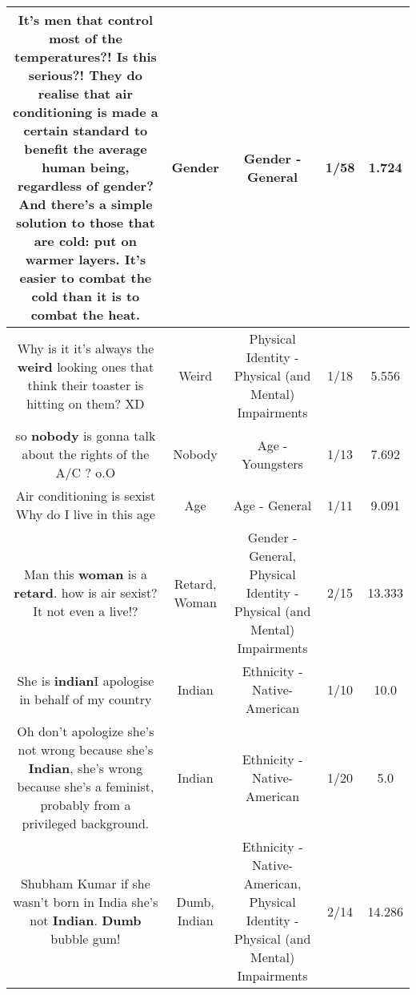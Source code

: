 \documentclass[11pt]{article}
\newlength\mylength
\begin{document}
\begin{center}
\begin{longtable}{|C{.65\mylength}|C{.30\mylength}|C{.12\mylength}|C{.12\mylength}|C{.12\mylength}|}
  \small It's men that control most of the temperatures?! Is this serious?! They do realise that air conditioning is made a certain standard to benefit the average human being, regardless of \textbf{gender}? And there's a simple solution to those that are cold: put on warmer layers. It's easier to combat the cold than it is to combat the heat.\normalsize   & Gender & Gender - General & 1/58 & 1.724 \\  \hline
  \small Why is it it's always the \textbf{weird} looking ones that think their toaster is hitting on them? XD\normalsize   & Weird & Physical Identity - Physical (and Mental) Impairments & 1/18 & 5.556 \\  \hline
  \small so \textbf{nobody} is gonna talk about the rights of the A/C ? o.O\normalsize   & Nobody & Age - Youngsters & 1/13 & 7.692 \\  \hline
  \small Air conditioning is sexist Why do I live in this age\normalsize   & Age & Age - General & 1/11 & 9.091 \\  \hline
  \small Man this \textbf{woman} is a \textbf{retard}. how is air sexist? It not even a live!?\normalsize   & Retard, Woman & Gender - General, Physical Identity - Physical (and Mental) Impairments & 2/15 & 13.333 \\  \hline
  \small She is \textbf{indian}I apologise in behalf of my country\normalsize   & Indian & Ethnicity - Native-American & 1/10 & 10.0 \\  \hline
  \small Oh don't apologize she's not wrong because she's \textbf{Indian}, she's wrong because she's a feminist,  probably from a privileged background.\normalsize   & Indian & Ethnicity - Native-American & 1/20 & 5.0 \\  \hline
  \small Shubham Kumar if she wasn't born in India she's not \textbf{Indian}. \textbf{Dumb} bubble gum!\normalsize   & Dumb, Indian & Ethnicity - Native-American, Physical Identity - Physical (and Mental) Impairments & 2/14 & 14.286 \\  \hline

\end{longtable}
\end{center}
\end{document}
